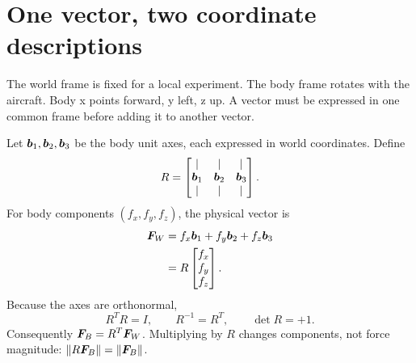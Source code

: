 \section{One vector, two coordinate descriptions}
The world frame is fixed for a local experiment. The body frame rotates with
the aircraft. Body x points forward, y left, z up. A vector must be expressed in
one common frame before adding it to another vector.

Let $\bm{b}_1,\bm{b}_2,\bm{b}_3$ be the body unit axes, each expressed in world
coordinates. Define
\begin{equation}
R=\begin{bmatrix}|&|&|\\\bm{b}_1&\bm{b}_2&\bm{b}_3\\|&|&|\end{bmatrix}.
\end{equation}
For body components $(f_x,f_y,f_z)$, the physical vector is
\begin{align}
\bm{F}_W&=f_x\bm{b}_1+f_y\bm{b}_2+f_z\bm{b}_3\\
&=R\begin{bmatrix}f_x\\f_y\\f_z\end{bmatrix}.
\end{align}
Because the axes are orthonormal,
\begin{equation}
R^TR=I,\qquad R^{-1}=R^T,\qquad \det R=+1.
\end{equation}
Consequently $\bm{F}_B=R^T\bm{F}_W$. Multiplying by $R$ changes components,
not force magnitude: $\|R\bm{F}_B\|=\|\bm{F}_B\|$.

